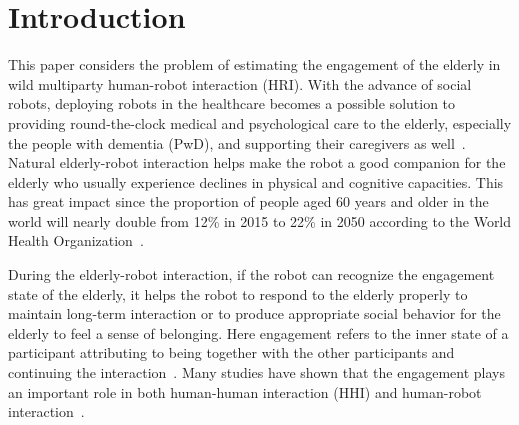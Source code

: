 \documentclass[VANCOUVER,STIX1COL]{WileyNJD-v2}
\begin{document}


\jnlcitation{\cname{%
}}

\maketitle




\section{Introduction}
\label{s:Introduction}

This paper considers the problem of estimating the engagement of the elderly in wild multiparty human-robot interaction (HRI). With the advance of social robots, deploying robots in the healthcare becomes a possible solution to providing round-the-clock medical and psychological care to the elderly, especially the people with dementia (PwD), and supporting their caregivers as well~\cite{Ghafurian2021Social,Perugia2020ENGAGEDEM}. Natural elderly-robot interaction helps make the robot a good companion for the elderly who usually experience declines in physical and cognitive capacities. This has great impact since the proportion of people aged 60 years and older in the world will nearly double from 12\% in 2015 to 22\% in 2050 according to the World Health Organization~\cite{WHO2021Ageing}.

During the elderly-robot interaction, if the robot can recognize the engagement state of the elderly, it helps the robot to respond to the elderly properly to maintain long-term interaction or to produce appropriate social behavior for the elderly to feel a sense of belonging. Here engagement refers to the inner state of a participant attributing to being together with the other participants and continuing the interaction~\cite{Poggi2013Mind}. Many studies have shown that the engagement plays an important role in both human-human interaction (HHI) and human-robot interaction~\cite{Jones2018Engagement}.
\end{document}

